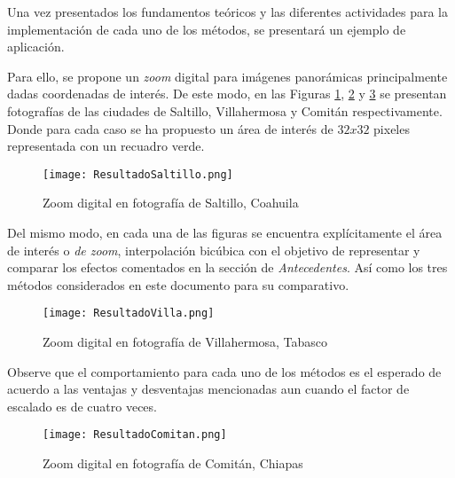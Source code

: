 \noindent
Una vez presentados los fundamentos teóricos y las diferentes actividades
para la implementación de cada uno de los métodos, se presentará 
un ejemplo de aplicación. 

Para ello, se propone un \emph{zoom} digital para imágenes panorámicas principalmente
dadas coordenadas de interés. De este modo, en las Figuras \ref{fig:saltillo},
\ref{fig:villahermosa} y \ref{fig:comitan} se presentan fotografías de las 
ciudades de Saltillo, Villahermosa y Comitán respectivamente. Donde para cada caso
se ha propuesto un área de interés de $32x32$ pixeles representada con
un recuadro verde. 

\begin{figure}[H]
    \texttt{[image:  ResultadoSaltillo.png]}
    \centering
    \caption{Zoom digital en fotografía de Saltillo, Coahuila}
    \label{fig:saltillo}
\end{figure}

Del mismo modo, en cada una de las figuras se encuentra explícitamente
el área de interés o \emph{de zoom}, interpolación bicúbica con el objetivo
de representar y comparar los efectos comentados en la sección de \emph{Antecedentes}.
Así como los tres métodos considerados en este documento para su comparativo.

\begin{figure}[H]
    \texttt{[image:  ResultadoVilla.png]}
    \centering
    \caption{Zoom digital en fotografía de Villahermosa, Tabasco}
    \label{fig:villahermosa}
\end{figure}

Observe que el comportamiento para cada uno de los métodos es el esperado de
acuerdo a las ventajas y desventajas mencionadas aun cuando el factor de escalado 
es de cuatro veces. 

\begin{figure}[H]
    \texttt{[image:  ResultadoComitan.png]}
    \centering
    \caption{Zoom digital en fotografía de Comitán, Chiapas}
    \label{fig:comitan}
\end{figure}